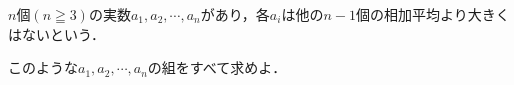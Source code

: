 \documentclass[../../main.tex]{subfiles}
\begin{document}
$n$個$(n\geqq3)$の実数$a_1,a_2,\cdots,a_n$があり，各$a_i$は他の$n-1$個の相加平均より大きくはないという．

このような$a_1,a_2,\cdots,a_n$の組をすべて求めよ．
\end{document}
